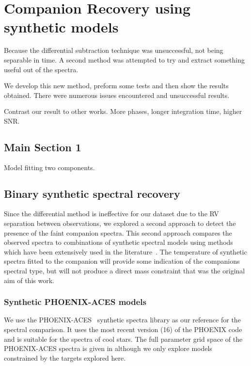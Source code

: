 
\chapter{Companion Recovery using synthetic models}  %
\label{cha:model_comparison}

Because the differential subtraction technique was unsuccessful, not being separable in time. A second method was attempted to try and extract something useful out of the spectra.

We develop this new method, preform some tests and then show the results obtained. There were numerous issues encountered and unsuccessful results.

Contrast our result to other works.  More phases, longer integration time, higher {SNR}.




\section{Main Section 1}
Model fitting two components.




\section{Binary synthetic spectral recovery}
\label{subsec:companion_recovery}
Since the differential method is ineffective for our dataset due to the {RV} separation between observations, we explored a second approach to detect the presence of the faint companion spectra. This second approach compares the observed spectra to combinations of synthetic spectral models using \textchisquared{} methods which have been extensively used in the literature~\citep[e.g.][]{astudillo-defru_harps_2015, passegger_fundamental_2016, zechmeister_spectrum_2018, nemravova_xtauri_2016}. {\red{} The temperature of synthetic spectra fitted to  the companion will provide some indication of the companions spectral type, but will not produce a direct mass constraint that was the original aim of this work.}

\subsection{Synthetic {PHOENIX-ACES} models}
\label{subsec:spec_models}
We use the {PHOENIX-ACES}~\citep{husser_new_2013} synthetic spectra library as our reference for the spectral comparison. It uses the most recent version (16) of the PHOENIX code and is suitable for the spectra of cool stars. The full parameter grid space of the {PHOENIX-ACES} spectra is given in  although we only explore models constrained by the targets explored here.

